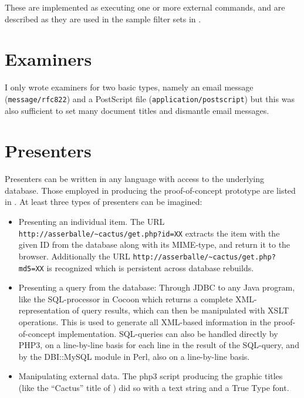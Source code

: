 These are implemented as executing one or more external commands, and
are described as they are used in the sample filter sets in
.

\section{Examiners}

I only wrote examiners for two basic types, namely an email message
(\texttt{message/rfc822}) and a PostScript file
(\texttt{application/postscript}) but this was also sufficient to set
many document titles and dismantle email messages.  


\section{Presenters}

Presenters can be written in any language with access to the
underlying database.  Those employed in producing the proof-of-concept
prototype are listed in .  At least three types
of presenters can be imagined:

\begin{itemize}
\item Presenting an individual item.  The URL
\texttt{http://asserballe/\~{}cactus/get.php?id=XX} extracts the item
with the given ID from the database along with its MIME-type, and
return it to the browser.  Additionally the URL
\texttt{http://asserballe/\~{}cactus/get.php?md5=XX} is recognized
which is persistent across database rebuilds.

\item Presenting a query from the database: Through JDBC to any Java
  program, like the SQL-processor in Cocoon which returns a complete
  XML-representation of query results, which can then be manipulated
  with XSLT operations.  This is used to generate all XML-based
  information in the proof-of-concept implementation.   SQL-queries
  can also be handled directly by PHP3, on a line-by-line basis for each line in the
  result of the SQL-query, and by the DBI::MySQL module in Perl, also on a
  line-by-line basis.

\item Manipulating external data.   The php3 script producing the
  graphic titles (like the ``Cactus'' title of
  ) did so with a text string and a
  True Type font.
  
\end{itemize}


